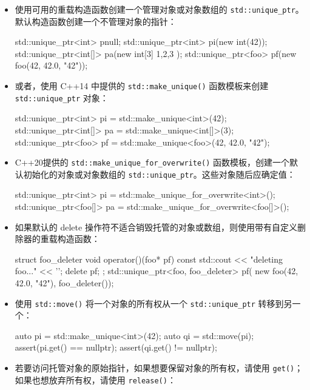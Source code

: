 \begin{itemize}
\item
使用可用的重载构造函数创建一个管理对象或对象数组的 \verb|std::unique_ptr|。默认构造函数创建一个不管理对象的指针：

\begin{cpp}
std::unique_ptr<int>   pnull;
std::unique_ptr<int>   pi(new int(42));
std::unique_ptr<int[]> pa(new int[3]{ 1,2,3 });
std::unique_ptr<foo>   pf(new foo(42, 42.0, "42"));
\end{cpp}

\item
或者，使用 C++14 中提供的 \verb|std::make_unique()| 函数模板来创建 \verb|std::unique_ptr| 对象：

\begin{cpp}
std::unique_ptr<int>   pi = std::make_unique<int>(42);
std::unique_ptr<int[]> pa = std::make_unique<int[]>(3);
std::unique_ptr<foo>   pf = std::make_unique<foo>(42, 42.0, "42");
\end{cpp}

\item
C++20提供的 \verb|std::make_unique_for_overwrite()| 函数模板，创建一个默认初始化的对象或对象数组的 \verb|std::unique_ptr|。这些对象随后应确定值：

\begin{cpp}
std::unique_ptr<int>   pi = std::make_unique_for_overwrite<int>();
std::unique_ptr<foo[]> pa = std::make_unique_for_overwrite<foo[]>();
\end{cpp}

\item
如果默认的 delete 操作符不适合销毁托管的对象或数组，则使用带有自定义删除器的重载构造函数：

\begin{cpp}
struct foo_deleter
{
    void operator()(foo* pf) const
    {
        std::cout << "deleting foo..." << '\n';
        delete pf;
    }
};
std::unique_ptr<foo, foo_deleter> pf(
    new foo(42, 42.0, "42"),
        foo_deleter());
\end{cpp}

\item
使用 \verb|std::move()| 将一个对象的所有权从一个 \verb|std::unique_ptr| 转移到另一个：

\begin{cpp}
auto pi = std::make_unique<int>(42);
auto qi = std::move(pi);
assert(pi.get() == nullptr);
assert(qi.get() != nullptr);
\end{cpp}

\item
若要访问托管对象的原始指针，如果想要保留对象的所有权，请使用 \verb|get()|；如果也想放弃所有权，请使用 \verb|release()|：


\end{itemize}
